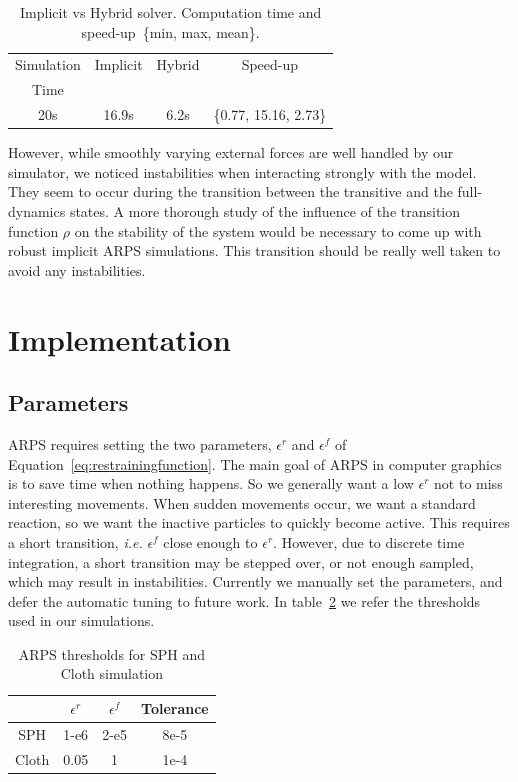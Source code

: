 \begin{table}[!h]
	\centering
	\begin{tabular}{|c|c|c|c|} \hline
		Simulation & Implicit  & Hybrid    & Speed-up \\
		Time & & & \\ \hline
		20s             & 16.9s     & 6.2s      &  \{0.77, 15.16, 2.73\}\\ \hline
	\end{tabular}
	\caption[ARPS: Implicit vs. Hybrid solver - Measurements]{\label{tab:clothePerf}Implicit vs Hybrid solver. Computation time and speed-up~\small{\{min, max, mean\}.}}
\end{table}

However, while smoothly varying external forces are well handled by our simulator, we noticed instabilities when interacting strongly with the model.
They seem to occur during the transition between the transitive and the full-dynamics states.
A more thorough study of the influence of the transition function $\rho$ on the stability of the system would be necessary to come up with robust implicit ARPS simulations.
 This transition should be really well taken to avoid any instabilities.

\section{Implementation} 
\label{sec:arps_implementation}

\subsection{ Parameters }
ARPS requires setting the two parameters, $\epsilon^{r}$ and $\epsilon^{f}$ of Equation~\ref{eq:restrainingfunction}.
The main goal of ARPS in computer graphics is to save time when nothing happens.
So we generally want a low $\epsilon^{r}$ not to miss interesting movements.
When sudden movements occur, we want a standard reaction, so we want the inactive particles to quickly become active.
This requires a short transition, \textit{i.e.} $\epsilon^{f}$ close enough to $\epsilon^{r}$.
However, due to discrete time integration, a short transition may be stepped over, or not enough sampled, which may result in instabilities.
Currently we manually set the parameters, and defer the automatic tuning to future work.
In table~\ref{tab:parameters} we refer the thresholds used in our simulations.

\begin{table}[!h]
    \centering
    \begin{tabular}{|c|c|c|c|} \hline
                & $\epsilon^{r}$    & $\epsilon^{f}$ & Tolerance \\ \hline
        SPH     &   1-e6            & 2-e5          & 8e-5 \\ \hline
        Cloth  &   0.05            & 1             & 1e-4 \\ \hline
\end{tabular}
    \caption[ARPS: Parameters for ARPS solver]{\label{tab:parameters} ARPS thresholds for SPH and Cloth simulation}
\end{table}

